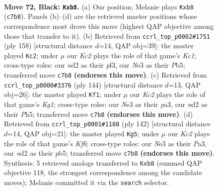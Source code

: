 \documentclass[11pt]{article}
\begin{document}
\clearpage

\begin{figure}[p]\centering
\begin{subfigure}{0.46\textwidth}\centering
\resizebox{\linewidth}{!}{%
\newchessgame
\chessboard[
  setfen={1Q6/2k5/7K/8/8/4n1q1/3N4/8 b - - 0 72},
  showmover=false,
  pgfstyle=straightmove, color=movearrow, markmove={c7-b8}
]}
\caption{}
\end{subfigure}\hfill
\begin{subfigure}{0.46\textwidth}\centering
\resizebox{\linewidth}{!}{%
\newchessgame
\chessboard[
  setfen={8/1k6/8/1PQ5/8/5p2/8/2K1q3 w - - 2 80},
  showmover=false,
  pgfstyle=straightmove, color=movearrow, markmove={c1-c2}
]}
\caption{}
\end{subfigure}
\\[4pt]
\begin{subfigure}{0.46\textwidth}\centering
\resizebox{\linewidth}{!}{%
\newchessgame
\chessboard[
  setfen={8/2k5/8/7P/3q4/p7/8/1Q4K1 w - - 3 73},
  showmover=false,
  pgfstyle=straightmove, color=movearrow, markmove={g1-f1}
]}
\caption{}
\end{subfigure}\hfill
\begin{subfigure}{0.46\textwidth}\centering
\resizebox{\linewidth}{!}{%
\newchessgame
\chessboard[
  setfen={3Q4/8/5K2/1p6/8/P7/5q2/1k6 w - - 12 72},
  showmover=false,
  pgfstyle=straightmove, color=movearrow, markmove={f6-g5}
]}
\caption{}
\end{subfigure}
\caption{\textbf{Move 72, Black: \texttt{Kxb8}.} (a) Our position; Melanie plays \texttt{Kxb8} (\texttt{c7b8}). Panels (b)--(d) are the retrieved master positions whose correspondence most drove this move (highest QAP objective among those that transfer to it). (b) Retrieved from \texttt{ccrl\_top\_p0002\#1751} (ply 158) [structural distance $d$=14, QAP obj=39]: the master played \texttt{Kc2}; under $\mu$ our \emph{Kc2} plays the role of that game's \emph{Kc1}; cross-type roles: our \emph{n}d2 as their \emph{p}f3, our \emph{N}e3 as their \emph{P}b5; transferred move \texttt{c7b8} \textbf{(endorses this move)}. (c) Retrieved from \texttt{ccrl\_top\_p0000\#3376} (ply 144) [structural distance $d$=13, QAP obj=26]: the master played \texttt{Kf1}; under $\mu$ our \emph{Kc2} plays the role of that game's \emph{Kg1}; cross-type roles: our \emph{N}e3 as their \emph{p}a3, our \emph{n}d2 as their \emph{P}h5; transferred move \texttt{c7b8} \textbf{(endorses this move)}. (d) Retrieved from \texttt{ccrl\_top\_p0001\#1188} (ply 142) [structural distance $d$=14, QAP obj=21]: the master played \texttt{Kg5}; under $\mu$ our \emph{Kc2} plays the role of that game's \emph{Kf6}; cross-type roles: our \emph{N}e3 as their \emph{P}a3, our \emph{n}d2 as their \emph{p}b5; transferred move \texttt{c7b8} \textbf{(endorses this move)}. Synthesis: 5 retrieved analogs transferred to \texttt{Kxb8} (summed QAP objective 118, the strongest correspondence among the candidate moves); Melanie committed it via the \texttt{search} selector.}
\label{fig:thought-m143}
\end{figure}
\end{document}
